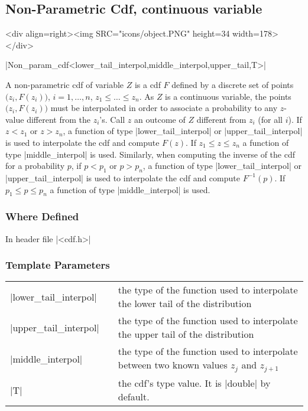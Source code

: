 \documentclass[12pt,twoside]{report}
\begin{document}
\subsection{Non-Parametric Cdf, continuous variable}
\begin{htmlonly}
<div align=right><img SRC="icons/object.PNG" height=34 width=178></div>
\end{htmlonly}

|Non_param_cdf<lower_tail_interpol,middle_interpol,upper_tail,T>|
\vspace{0.3cm}

A non-parametric cdf of variable $Z$ is a cdf $F$ defined by a discrete set of points $\Big( z_i, F(z_i) \Big)$, $i=1,\ldots,n$, $z_1 \le \ldots \le z_n$. 
As $Z$ is a continuous variable, the points  $\Big( z_i, F(z_i) \Big)$ must be interpolated in order to associate a probability to any $z$-value different from the $z_i$'s. Call $z$ an outcome of $Z$ different from $z_i$ (for all $i$). 
If $z<z_1$ or $z>z_n$, a function of type |lower_tail_interpol| or |upper_tail_interpol| is used to interpolate the cdf and compute $F(z)$. If $z_1 \le z \le z_n$ a function of type |middle_interpol| is used. Similarly, when computing the inverse of the cdf for a probability $p$, if $p<p_1$ or $p>p_n$, a function of type |lower_tail_interpol| or |upper_tail_interpol| is used to interpolate the cdf and compute $F^{-1}(p)$. If $p_1 \le p \le p_n$ a function of type |middle_interpol| is used.

\htmlrule[CLEAR=all]  \subsubsection*{Where Defined}
In header file |<cdf.h>|

\htmlrule[CLEAR=all]  \subsubsection*{Template Parameters}
\begin{tabular}[!h]{l l p{10cm}}
|lower_tail_interpol| & & the type of the function used to interpolate the lower tail of the distribution\\
|upper_tail_interpol| & & the type of the function used to interpolate the upper tail of the distribution\\
|middle_interpol| & & the type of the function used to interpolate between two known values $z_j$ and $z_{j+1}$\\
|T| & & the cdf's type value. It is |double| by default.\\
\end{tabular}
\end{document}
